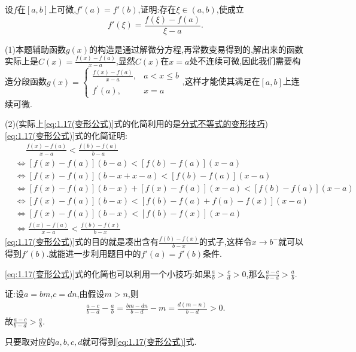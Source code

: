 \documentclass[lang=cn,newtx,10pt,scheme=chinese]{elegantbook}
\begin{document}
\begin{exercise}
    设\(f\)在\([a,b]\)上可微,\(f'(a) = f'(b)\),证明:存在\(\xi\in(a,b)\),使成立
    \[
    f'(\xi) = \frac{f(\xi) - f(a)}{\xi - a}.
    \]
\end{exercise}
\begin{note}
(1)本题辅助函数$g(x)$的构造是通过解微分方程,再常数变易得到的,解出来的函数实际上是$C(x)=\frac{f(x) - f(a)}{x - a}$,显然$C(x)$在$x=a$处不连续可微,因此我们需要构造分段函数$g(x) = \begin{cases}
    \frac{f(x) - f(a)}{x - a}, & a < x \leq b\\
    f^{\prime}(a), & x = a
\end{cases}$,这样才能使其满足在$[a,b]$上连续可微.

(2)(实际上\eqref{eq:1.17(变形公式)}式的化简利用的是\hyperref[pro:分式不等式等价变形]{分式不等式的变形技巧})
\eqref{eq:1.17(变形公式)}式的\hypertarget{1.17式的化简证明}{化简证明}:
\begin{align*}
    &\,\,\,\,\,\,\,\,\frac{f(x)-f(a)}{x-a}<\frac{f(b)-f(a)}{b-a}
\\
&\Leftrightarrow \left[ f\left( x \right) -f\left( a \right) \right] \left( b-a \right) <\left[ f\left( b \right) -f\left( a \right) \right] \left( x-a \right) 
\\
&\Leftrightarrow \left[ f\left( x \right) -f\left( a \right) \right] \left( b-x+x-a \right) <\left[ f\left( b \right) -f\left( a \right) \right] \left( x-a \right) 
\\
&\Leftrightarrow \left[ f\left( x \right) -f\left( a \right) \right] \left( b-x \right) +\left[ f\left( x \right) -f\left( a \right) \right] \left( x-a \right) <\left[ f\left( b \right) -f\left( a \right) \right] \left( x-a \right) 
\\
&\Leftrightarrow \left[ f\left( x \right) -f\left( a \right) \right] \left( b-x \right) <\left[ f\left( b \right) -f\left( a \right) +f\left( a \right) -f\left( x \right) \right] \left( x-a \right) 
\\
&\Leftrightarrow \left[ f\left( x \right) -f\left( a \right) \right] \left( b-x \right) <\left[ f\left( b \right) -f\left( x \right) \right] \left( x-a \right) 
\\
&\Leftrightarrow \frac{f(x)-f(a)}{x-a}<\frac{f(b)-f(x)}{b-x}
\end{align*}
\eqref{eq:1.17(变形公式)}式的目的就是凑出含有$\frac{f(b)-f(x)}{b-x}$的式子,这样令$x\to b^-$就可以得到$f'(b)$.就能进一步利用题目中的$f'(a)=f'(b)$条件.
\end{note}
\begin{remark}
    \eqref{eq:1.17(变形公式)}式的化简也可以利用一个小技巧:如果\(\frac{a}{b}>\frac{c}{d}>0\),那么\(\frac{a - c}{b - d}>\frac{a}{b}\).

    证:设\(a = bm\),\(c = dn\),由假设\(m>n\),则
    \begin{align*}
        \frac{a - c}{b - d} - \frac{a}{b} = \frac{bm - dn}{b - d} - m = \frac{d(m - n)}{b - d}>0.
    \end{align*}
    故\(\frac{a - c}{b - d}>\frac{a}{b}\).
    
    只要取对应的\(a,b,c,d\)就可得到\eqref{eq:1.17(变形公式)}式.
\end{remark}
\end{document}
